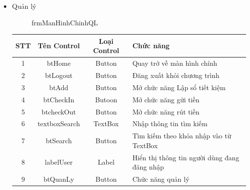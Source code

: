 \documentclass{article}
\begin{document}
\begin{enumerate}
\begin{itemize}
					
					\newpage
					
					\item Quản lý
					
					\begin{figure}[!h]
						\setlength\fboxsep{1pt}
						\setlength\fboxrule{1pt}
						\caption{frmManHinhChinhQL}
						\label{fig:frmManHinhChinhQL}
					\end{figure}
					
					\begin{tabular}{|c|c|c| p{5cm}|}
						
						\hline
						STT & Tên Control & Loại Control & Chức năng \\
						\hline
						1 & btHome & Button & Quay trở về màn hình chính\\
						\hline
						2 & btLogout & Button & Đăng xuất khỏi chương trình \\
						\hline
						3 & btAdd & Button & Mở chức năng Lập sổ tiết kiệm \\
						\hline
						4 & btCheckIn & Butoon & Mở chức năng gửi tiền \\
						\hline
						5 & btcheckOut & Button & Mở chức năng rút tiền \\
						\hline
						6 & textboxSearch & TextBox & Nhập thông tin tìm kiếm \\
						\hline
						7 & btSearch & Button & Tìm kiếm theo khóa nhập vào từ TextBox\\
						\hline
						8 & labelUser & Label & Hiển thị thông tin người dùng đang đăng nhập\\
						\hline
						9 & btQuanLy & Button & Chức năng quản lý\\
						\hline
					\end{tabular}
					

\end{itemize}
\end{enumerate}
\end{document}
